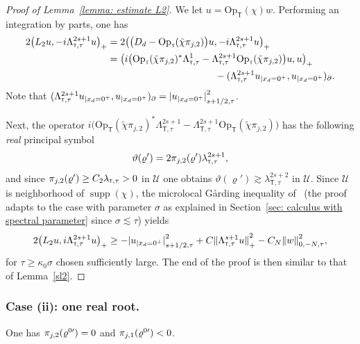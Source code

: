 \documentclass[JEP,XML,SOM,Unicode,published]{cedram}
\theoremstyle{plain}
\theoremstyle{definition}
\newcommand{\nhd}{neighborhood\xspace}
\newcommand{\suff}{sufficiently\xspace}
\let\k\kappa
\let\y\varrho
\newcommand{\tchi}{\tilde{\chi}}
\let \Re \relax
\DeclareMathOperator{\Re}{Re}
\let \Im \relax
\DeclareMathOperator{\Im}{Im}
\newcommand{\inp}[2]{(#1, #2)}
\newcommand{\biginp}[2]{\big(#1, #2 \big)}
\newcommand{\U}{\mathscr U}
\newcommand{\br}{\ensuremath{_{|x_d=0^+}}}
\newcommand{\Opt}{\ensuremath{\mathrm{Op}_{\scriptscriptstyle{\mathsf{T}}}}}
\newcommand{\Norm}[2]{{\| #1 \|}_{#2}}
\newcommand{\Normsc}[2]{{\| #1 \|}_{#2, \tau}}
\newcommand{\normsc}[2]{{| #1 |}_{#2, \tau}}
\newcommand{\lsct}{\lambda_{{\scriptscriptstyle{\mathsf T}},\tau}}
\newcommand{\Lsct}{\Lambda_{{\scriptscriptstyle{\mathsf T}},\tau}}
\DeclareMathOperator{\supp}{supp}
\begin{document}
\begin{proof}[Proof of Lemma~\ref{lemma: estimate L2}]
We let $u=\Opt(\chi)w$. Performing an integration by parts, one has
\begin{align*}
2\Re\biginp{L_2 u}{-i\Lsct^{2s+1} u}_+
& = 2\Re\biginp{ \big(D_d-\Opt(\tchi\pi_{j,2})\big)u} {-i\Lsct^{2s+1} u}_+\\
&= \Re \biginp{i
\big(\Opt(\tchi\pi_{j,2})^*\Lsct^1 - \Lsct^{2s+1}\Opt(\tchi\pi_{j,2})\big)
u}{u}_+\\
&\hspace*{3.9cm} - \Re\inp{\Lsct^{2s+1}u\br}{u\br}_{\partial}.
\end{align*}
Note that
$\Re\inp{\Lsct^{2s+1}u\br}{u\br}_{\partial}
= \normsc{u\br}{s+1/2}^2$.

Next, the operator
$i \big(\Opt(\tchi\pi_{j,2})^*\Lsct^{2s+1}
-\Lsct^{2s+1}\Opt(\tchi\pi_{j,2})\big) $
has the following \emph{real} principal symbol
\begin{equation*}
\vartheta(\y')=2\Im\pi_{j,2}(\y')\lsct^{2s+1},
\end{equation*}
and since $\Im\pi_{j,2}(\y') \geq C_2 \lsct >0$ in $\U$ one obtains
$\vartheta(\y')\gtrsim\lsct^{2s+2}$ in $\U$. Since $\U$ is \nhd of
$\supp(\chi)$, the microlocal G{\aa}rding inequality of~\cite[Th.\,2.49]{JGL-vol1} (the proof adapts to the case with parameter $\sigma$ as
explained in Section~\ref{sec: calculus with spectral parameter} since $\sigma
\lesssim \tau$) yields
\begin{equation*}
2\Re\biginp{L_2 u}{i\Lsct^{2s+1} u}_+
\geq - \normsc{u\br}{s+1/2}^2
+C\Norm{\Lsct^{s+1}u}{+}^2
-C_N\Normsc{w}{0,-N}^2,
\end{equation*}
for $\tau\geq \k_0\sigma$ chosen \suff
large.
The end of the proof is then similar to that of Lemma~\ref{sl2}.
\end{proof}

\subsubsection{Case (ii): one real root.}
\label{sec: Case 1: one root up}
One has
$\Im\pi_{j,2}(\y^{0\prime}) = 0$ and $\Im \pi_{j,1} (\y^{0\prime})<0$.
\end{document}
